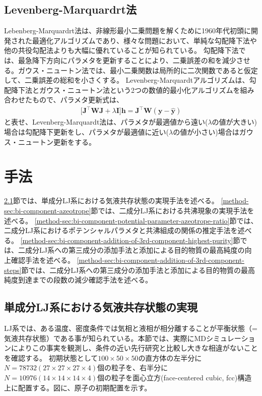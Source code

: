 \documentclass[titlepage]{jsreport}
\begin{document}
\section{Levenberg-Marquardrt法}\label{principle-sec:levenberg-marquardt}
Lebenberg-Marquardrt法は、非線形最小二乗問題を解くために1960年代初頭に開発された最適化アルゴリズムであり、様々な問題において、単純な勾配降下法や他の共役勾配法よりも大幅に優れていることが知られている\cite{levenberg-marquardt}。
勾配降下法では、最急降下方向にパラメタを更新することにより、二乗誤差の和を減少させる。ガウス・ニュートン法では、最小二乗関数は局所的に二次関数であると仮定して、二乗誤差の総和を小さくする。
Levenberg-Marquardtアルゴリズムは、勾配降下法とガウス・ニュートン法という2つの数値的最小化アルゴリズムを組み合わせたもので、パラメタ更新式は、
\large
\begin{eqnarray}
\Big[\bm{J}^\top\bm{W}\bm{J}+\lambda\bm{I}\Big]\bm{h} = \bm{J}^\top\bm{W}(\bm{y}-\bm{\hat{y}})
\end{eqnarray}
\normalsize
と表せ、Levenberg-Marquardt法は、パラメタが最適値から遠い($\lambda$の値が大きい)場合は勾配降下更新をし、パラメタが最適値に近い($\lambda$の値が小さい)場合はガウス・ニュートン更新をする\cite{gradient-descent_gauss-newton_levenberg-marquardt}。


\chapter{手法} \label{chap:method}
\ref{method-sec:mono-component}節では、単成分LJ系における気液共存状態の実現手法を述べる。
\ref{method-sec:bi-component-azeotrope}節では、二成分LJ系における共沸現象の実現手法を述べる。
\ref{method-sec:bi-component-potential-parameter-azeotrope-ratio}節では、二成分LJ系におけるポテンシャルパラメタと共沸組成の関係の推定手法を述べる。
\ref{method-sec:bi-component-addition-of-3rd-component-highest-purity}節では、二成分LJ系への第三成分の添加手法と添加による目的物質の最高純度の向上確認手法を述べる。
\ref{method-sec:bi-component-addition-of-3rd-component-steps}節では、二成分LJ系への第三成分の添加手法と添加による目的物質の最高純度到達までの段数の減少確認手法を述べる。


\section{単成分LJ系における気液共存状態の実現} \label{method-sec:mono-component}
LJ系では、ある温度、密度条件では気相と液相が相分離することが平衡状態（=気液共存状態）である事が知られている\cite{gas-liquid-equilibrium}。本節では、実際にMDシミュレーションによりこの事実を観測し、条件の近い先行研究と比較し大きな相違がないことを確認する。
初期状態として$100×50×50$の直方体の左半分に$N=78732(27×27×27×4)$個の粒子を、右半分に$N=10976(14×14×14×4)$個の粒子を面心立方(face-centered cubic, fcc)構造上に配置する。図に、原子の初期配置を示す。
\end{document}
